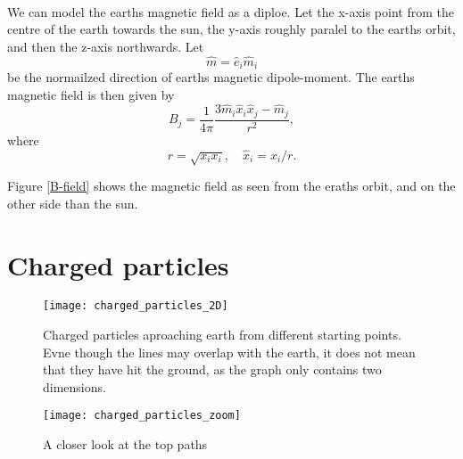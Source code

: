 \documentclass{article}
\begin{document}
    \paragraph{}
    We can model the earths magnetic field as a diploe. Let the x-axis point from the centre of the earth towards the sun, the y-axis roughly paralel to the earths orbit, and then the z-axis northwards. Let
        \begin{equation*}
            \hat m = \hat e_i \hat m_i
        \end{equation*}
        be the normailzed direction of earths magnetic dipole-moment. The earths magnetic field is then given by
        \begin{equation}
            B_j = \frac{1}{4\pi} \frac{3\hat m_i \hat x_i \hat x_j - \hat m_j}{r^2},
        \end{equation}
        where
        \begin{equation*}
            r = \sqrt{x_ix_i}, \quad \hat x_i = x_i / r.
        \end{equation*}

        Figure \ref{B-field} shows the magnetic field as seen from the eraths orbit, and on the other side than the sun. 

    \section*{Charged particles}

    \begin{figure}
        \centering
        \vspace{-50px}
        \texttt{[image: charged\_particles\_2D]}
        \caption{Charged particles aproaching earth from different starting points. Evne though the lines may overlap with the earth, it does not mean that they have hit the ground, as the graph only contains two dimensions.}
        \label{Charged particles}
    \end{figure}

    \begin{figure}
        \centering
        \vspace{-50px}
        \texttt{[image: charged\_particles\_zoom]}
        \caption{A closer look at the top paths}
        \label{Charged particles zoom}
    \end{figure}
\end{document}
